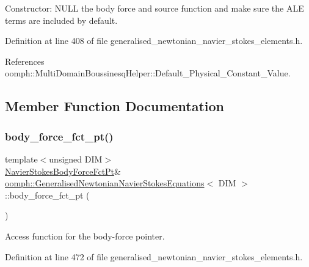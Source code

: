 Constructor\+: N\+U\+LL the body force and source function and make sure the A\+LE terms are included by default. 



Definition at line 408 of file generalised\+\_\+newtonian\+\_\+navier\+\_\+stokes\+\_\+elements.\+h.



References oomph\+::\+Multi\+Domain\+Boussinesq\+Helper\+::\+Default\+\_\+\+Physical\+\_\+\+Constant\+\_\+\+Value.



\subsection{Member Function Documentation}
\mbox{\label{classoomph_1_1GeneralisedNewtonianNavierStokesEquations_aaa4bbed453f5e562f321874510e51e48}} 
\subsubsection{\texorpdfstring{body\+\_\+force\+\_\+fct\+\_\+pt()}{body\_force\_fct\_pt()}\hspace{0.1cm}{\footnotesize\ttfamily [1/2]}}
{\footnotesize\ttfamily template$<$unsigned D\+IM$>$ \\
\hyperlink{classoomph_1_1GeneralisedNewtonianNavierStokesEquations_a0076b2b1b6ad17d306907c959b3f4d12}{Navier\+Stokes\+Body\+Force\+Fct\+Pt}\& \hyperlink{classoomph_1_1GeneralisedNewtonianNavierStokesEquations}{oomph\+::\+Generalised\+Newtonian\+Navier\+Stokes\+Equations}$<$ D\+IM $>$\+::body\+\_\+force\+\_\+fct\+\_\+pt (\begin{DoxyParamCaption}{ }\end{DoxyParamCaption})\hspace{0.3cm}{\ttfamily [inline]}}



Access function for the body-\/force pointer. 



Definition at line 472 of file generalised\+\_\+newtonian\+\_\+navier\+\_\+stokes\+\_\+elements.\+h.



